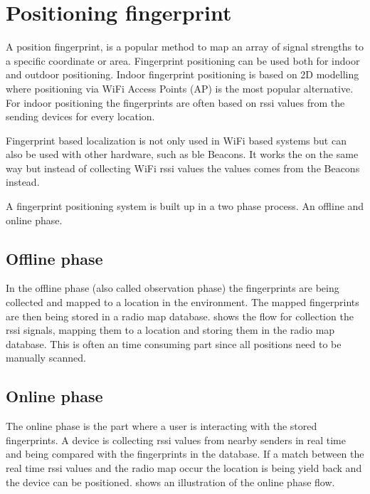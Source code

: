 \section{Positioning fingerprint}\label{sec:theoryFingerprint} A position fingerprint, is a popular method to map an array of signal strengths to a specific coordinate or area.
Fingerprint positioning can be used both for indoor and outdoor positioning.
Indoor fingerprint positioning is based on 2D modelling where positioning via WiFi Access Points (AP) is the most popular alternative.
For indoor positioning the fingerprints are often based on
\acrshort{rssi} values from the sending devices for every location.
\cite{LocationFingerprintingInfrastructure2004,
IndoorFingerprintPositioning2017}

\bigskip

Fingerprint based localization is not only used in WiFi based systems but can
also be used with other hardware, such as \acrshort{ble} Beacons.  It works the
on the same way but instead of collecting WiFi \acrshort{rssi} values the values
comes from the Beacons instead.  \cite{PracticalFingerprintingLocalization2017} 

\bigskip

A fingerprint positioning system is built up in a two phase process.  An offline
and online phase.\cite{IndoorFingerprintPositioning2017} 

\subsection{Offline phase}\label{sec:theoryFingerprintOffline} In the offline
phase (also called observation phase) the fingerprints are being collected and
mapped to a location in the environment.  The mapped fingerprints are then being
stored in a radio map database.  
shows the flow for collection the \acrshort{rssi} signals, mapping them to a
location and storing them in the radio map database.  This is often an time
consuming part since all positions need to be manually
scanned.\cite{IndoorFingerprintPositioning2017} 



\newpage

\subsection{Online phase}\label{sec:theoryFingerprintOnline} The online phase
is the part where a user is interacting with the stored fingerprints.  A device
is collecting \acrshort{rssi} values from nearby senders in real time and being
compared with the fingerprints in the database.  If a match between the real
time \acrshort{rssi} values and the radio map occur the location is being yield
back and the device can be positioned.\cite{IndoorFingerprintPositioning2017}
 shows an illustration of the
online phase flow.


